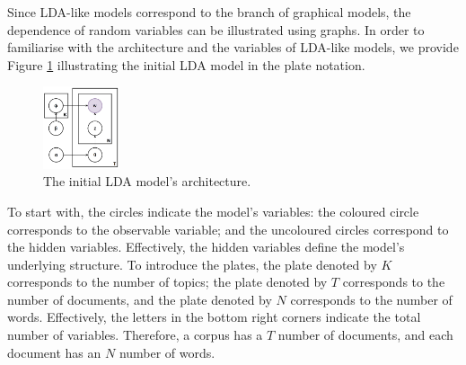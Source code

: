 \documentclass{mpaper}
\begin{document}
\par Since LDA-like models correspond to the branch of graphical models, the dependence of random variables can be illustrated using graphs. In order to familiarise with the architecture and the variables of LDA-like models, we provide Figure \ref{fig:arch_LDA-init} illustrating the initial LDA model in the plate notation.
\begin{figure}[h]
  \centering
  \includegraphics[width=0.20\textwidth]{LDA-initial.png}
  \caption{The initial LDA model's architecture.}
  \label{fig:arch_LDA-init}
\end{figure}
To start with, the circles indicate the model's variables: the coloured circle corresponds to the observable variable; and the uncoloured circles correspond to the hidden variables. Effectively, the hidden variables define the model's underlying structure. To introduce the plates, the plate denoted by $K$ corresponds to the number of topics; the plate denoted by $T$ corresponds to the number of documents, and the plate denoted by $N$ corresponds to the number of words. Effectively, the letters in the bottom right corners indicate the total number of variables. Therefore, a corpus has a $T$ number of documents, and each document has an $N$ number of words.
\end{document}
